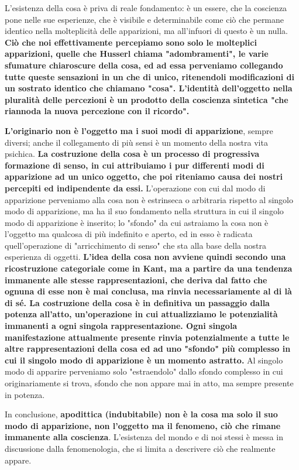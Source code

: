 L'esistenza della cosa è priva di reale fondamento:
è un essere, che la coscienza pone nelle sue
esperienze, che è visibile e determinabile
come ciò che permane identico nella molteplicità
delle apparizioni, ma all'infuori di questo è
un nulla.
\textbf{Ciò che noi effettivamente percepiamo sono
solo le molteplici apparizioni, quelle che
Husserl chiama "adombramenti", le varie
sfumature chiaroscure della cosa, ed ad essa
perveniamo collegando tutte queste sensazioni
in un che di unico, ritenendoli modificazioni di un sostrato identico che chiamano
"cosa".
L'identità dell'oggetto nella pluralità delle
percezioni è un prodotto della coscienza sintetica
"che riannoda la nuova percezione con il ricordo".}


\textbf{L'originario non è l'oggetto ma i suoi modi
di apparizione}, sempre diversi; anche il collegamento di più sensi è un momento della nostra vita
psichica.
\textbf{La costruzione della cosa è un processo di
progressiva formazione di senso, in cui
attribuiamo i pur differenti modi di
apparizione ad un unico oggetto, che poi
riteniamo causa dei nostri percepiti ed
indipendente da essi.}
L'operazione con cui dal modo di apparizione
perveniamo alla cosa non è estrinseca o arbitraria
rispetto al singolo modo di apparizione, ma ha il
suo fondamento nella struttura in cui il singolo
modo di apparizione è inserito; lo "sfondo" da cui astraiamo la cosa
non è l'oggetto ma qualcosa di più indefinito e aperto, ed in esso è radicata quell'operazione di "arricchimento di senso" che sta
alla base della nostra esperienza di oggetti.
\textbf{L'idea della cosa non avviene quindi secondo una
ricostruzione categoriale come in Kant,
ma a partire da una tendenza immanente
alle stesse rappresentazioni, che deriva dal
fatto che ognuna di esse non è mai
conclusa, ma rinvia necessariamente al
di là di sé. La costruzione della cosa è
in definitiva un passaggio dalla potenza
all'atto, un'operazione in cui attualizziamo
le potenzialità immanenti a ogni singola
rappresentazione.
Ogni singola manifestazione attualmente presente
rinvia potenzialmente a tutte le altre rappresentazioni della cosa ed ad uno "sfondo" più
complesso in cui il singolo modo di apparizione è
un momento astratto.} Al singolo modo di
apparire perveniamo solo "estraendolo" dallo sfondo
complesso in cui originariamente si trova,
sfondo che non appare mai in atto, ma sempre
presente in potenza.

In conclusione, \textbf{apodittica (indubitabile) non è la cosa ma solo
il suo modo di apparizione, non l'oggetto
ma il fenomeno, ciò che rimane immanente
alla coscienza}. L'esistenza del mondo e
di noi stessi è messa in discussione dalla
fenomenologia, che si limita a descrivere ciò
che realmente appare.

